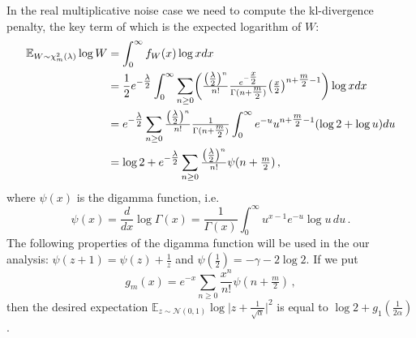 \documentclass[a4paper,10pt]{article}
\begin{document}
In the real multiplicative noise case we need to compute the kl-divergence penalty, the key
term of which is the expected logarithm of $W$:
\begin{align}
  \mathbb{E}_{W\sim \chi^2_m(\lambda)} \log W
    &= \int_0^\infty f_W(x) \log x dx
    \notag \\
    &= \frac12 e^{- \tfrac\lambda2}
    \int_0^\infty \sum_{n \geq 0} \biggl(
        \tfrac{\bigl(\tfrac\lambda2\bigr)^n}{n!}
        \tfrac{e^{- \tfrac{x}2}}{\Gamma(n + \tfrac{m}2)}
        \bigl(\tfrac{x}2\bigr)^{n + \tfrac{m}2 - 1}
    \biggr) \log x dx
    \notag \\
    &= e^{- \tfrac\lambda2} \sum_{n \geq 0}
        \tfrac{\bigl(\tfrac\lambda2\bigr)^n}{n!}
    \tfrac1{\Gamma(n + \tfrac{m}2)}
    \int_0^\infty
        e^{- u} u^{n + \tfrac{m}2 - 1}
        (\log2 + \log u) du
    \notag \\
    &= \log{2}
    + e^{- \tfrac\lambda2} \sum_{n \geq 0}
        \tfrac{\bigl(\tfrac\lambda2\bigr)^n}{n!}
        \psi(n + \tfrac{m}2)
    \,,
\end{align}
where $\psi(x)$ is the digamma function, i.e.
$$
\psi(x)
  = \frac{d}{dx} \log \Gamma(x)
  = \frac1{\Gamma(x)}
    \int_0^\infty
      u^{x-1} e^{-u} \log{u}
    \, du
  \,. $$
The following properties of the digamma function will be used in the our analysis:
$
  \psi(z+1) = \psi(z) + \tfrac1z
$ and $
  \psi(\tfrac12) = -\gamma - 2\log 2
$. If we put
$$
g_m(x)
  = e^{-x} \sum_{n \geq 0} \frac{x^n}{n!} \psi(n + \tfrac{m}2)
  \,, $$
then the desired expectation $
  \mathbb{E}_{z \sim \mathcal{N}(0, 1)}
    \log{\bigl\lvert z + \tfrac1{\sqrt{\alpha}} \bigr\rvert^2}
$ is equal to $
  \log{2} + g_1(\tfrac1{2\alpha})
$.
\end{document}

